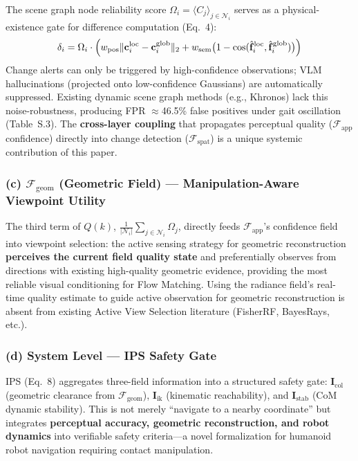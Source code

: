\documentclass[10pt,a4paper]{article}
\begin{document}
The scene graph node reliability score $\Omega_i = \langle C_j\rangle_{j\in\mathcal{N}_i}$ serves as a physical-existence gate for difference computation (Eq.~4):
\begin{equation}
  \delta_i = \Omega_i\cdot\Bigl(w_{\text{pos}}\|\mathbf{c}_i^{\text{loc}}-\mathbf{c}_i^{\text{glob}}\|_2 + w_{\text{sem}}\bigl(1-\cos(\hat{\mathbf{f}}_i^{\text{loc}},\hat{\mathbf{f}}_i^{\text{glob}})\bigr)\Bigr)
\end{equation}
Change alerts can only be triggered by high-confidence observations; VLM hallucinations (projected onto low-confidence Gaussians) are automatically suppressed. Existing dynamic scene graph methods (e.g., Khronos) lack this noise-robustness, producing FPR $\approx$46.5\% false positives under gait oscillation (Table~S.3). The \textbf{cross-layer coupling} that propagates perceptual quality ($\mathcal{F}_{\text{app}}$ confidence) directly into change detection ($\mathcal{F}_{\text{spat}}$) is a unique systemic contribution of this paper.

\subsubsection*{(c) $\mathcal{F}_{\text{geom}}$ (Geometric Field) --- Manipulation-Aware Viewpoint Utility}

The third term of $Q(k)$, $\frac{1}{|\mathcal{N}_i|}\sum_{j\in\mathcal{N}_i}\Omega_j$, directly feeds $\mathcal{F}_{\text{app}}$'s confidence field into viewpoint selection: the active sensing strategy for geometric reconstruction \textbf{perceives the current field quality state} and preferentially observes from directions with existing high-quality geometric evidence, providing the most reliable visual conditioning for Flow Matching. Using the radiance field's real-time quality estimate to guide active observation for geometric reconstruction is absent from existing Active View Selection literature (FisherRF, BayesRays, etc.).

\subsubsection*{(d) System Level --- IPS Safety Gate}

IPS (Eq.~8) aggregates three-field information into a structured safety gate: $\mathbf{I}_{\text{col}}$ (geometric clearance from $\mathcal{F}_{\text{geom}}$), $\mathbf{I}_{\text{ik}}$ (kinematic reachability), and $\mathbf{I}_{\text{stab}}$ (CoM dynamic stability). This is not merely ``navigate to a nearby coordinate'' but integrates \textbf{perceptual accuracy, geometric reconstruction, and robot dynamics} into verifiable safety criteria---a novel formalization for humanoid robot navigation requiring contact manipulation.
\end{document}
